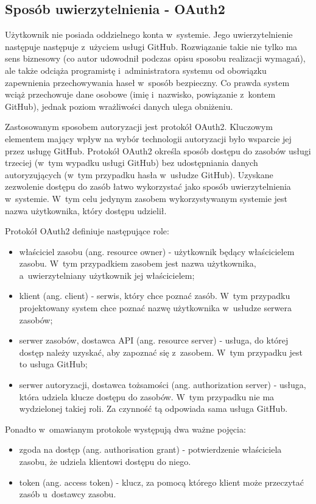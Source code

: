 \subsection{Sposób uwierzytelnienia - OAuth2}
Użytkownik nie posiada oddzielnego konta w~systemie. Jego uwierzytelnienie następuje następuje z~użyciem usługi GitHub. Rozwiązanie takie nie tylko ma sens biznesowy (co autor udowodnił podczas opisu sposobu realizacji wymagań), ale także odciąża programistę i~administratora systemu od obowiązku zapewnienia przechowywania haseł w~sposób bezpieczny. Co prawda system wciąż przechowuje dane osobowe (imię i~nazwisko, powiązanie z~kontem GitHub), jednak poziom wrażliwości danych ulega obniżeniu. 

\medskip
Zastosowanym sposobem autoryzacji jest protokół OAuth2. Kluczowym elementem mający wpływ na wybór technologii autoryzacji było wsparcie jej przez usługę GitHub. Protokół OAuth2 określa sposób dostępu do zasobów usługi trzeciej (w~tym wypadku usługi GitHub) bez udostępniania danych autoryzujących (w~tym przypadku hasła w~usłudze GitHub). Uzyskane zezwolenie dostępu do zasób łatwo wykorzystać jako sposób uwierzytelnienia w~systemie. W~tym celu jedynym zasobem wykorzystywanym systemie jest nazwa użytkownika, który dostępu udzielił.

\medskip
Protokół OAuth2 definiuje następujące role:
\begin{itemize}
    \item właściciel zasobu (ang. resource owner) - użytkownik będący właścicielem zasobu. W~tym przypadkiem zasobem jest nazwa użytkownika, a~uwierzytelniany użytkownik jej właścicielem;
    
    \item klient (ang. client) - serwis, który chce poznać zasób. W~tym przypadku projektowany system chce poznać nazwę użytkownika w~usłudze serwera zasobów;
    
    \item serwer zasobów, dostawca API (ang. resource server) - usługa, do której dostęp należy uzyskać, aby zapoznać się z~zasobem. W~tym przypadku jest to usługa GitHub;
    
    \item serwer autoryzacji, dostawca tożsamości (ang. authorization server) - usługa, która udziela klucze dostępu do zasobów. W~tym przypadku nie ma wydzielonej takiej roli. Za czynność tą odpowiada sama usługa GitHub.
\end{itemize}

\medskip
Ponadto w~omawianym protokole występują dwa ważne pojęcia:
\begin{itemize}
    \item zgoda na dostęp (ang. authorisation grant) - potwierdzenie właściciela zasobu, że udziela klientowi dostępu do niego.
    \item token (ang. access token) - klucz, za pomocą którego  klient może przeczytać zasób u~dostawcy zasobu.
\end{itemize}

